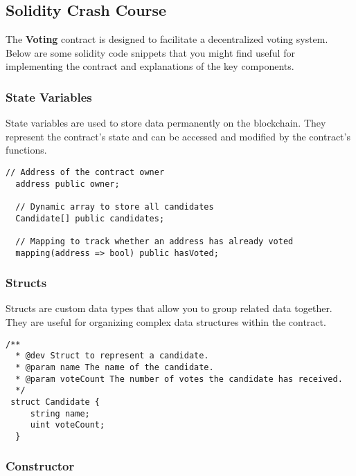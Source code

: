 \documentclass[12pt]{article}
\begin{document}
\subsection{Solidity Crash Course}

The \textbf{Voting} contract is designed to facilitate a decentralized voting system. Below are some solidity code snippets that you might find useful for implementing the contract and explanations of the key components.

\subsubsection*{State Variables}

State variables are used to store data permanently on the blockchain. They represent the contract's state and can be accessed and modified by the contract's functions.

\noindent
\begin{minipage}[c]{\textwidth}
\begin{lstlisting}[language=Solidity]
  // Address of the contract owner
  address public owner;

  // Dynamic array to store all candidates
  Candidate[] public candidates;

  // Mapping to track whether an address has already voted
  mapping(address => bool) public hasVoted;
\end{lstlisting}
\end{minipage}

\subsubsection*{Structs}

Structs are custom data types that allow you to group related data together. They are useful for organizing complex data structures within the contract.

\noindent
\begin{minipage}[c]{\textwidth}
\begin{lstlisting}[language=Solidity]
  /**
  * @dev Struct to represent a candidate.
  * @param name The name of the candidate.
  * @param voteCount The number of votes the candidate has received.
  */
 struct Candidate {
     string name;
     uint voteCount;
  }
\end{lstlisting}
\end{minipage}

\subsubsection*{Constructor}
\end{document}
